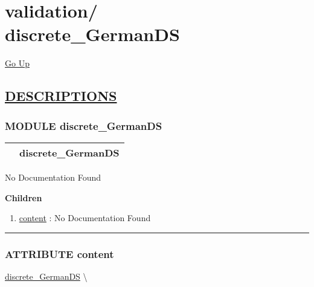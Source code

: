 \chapter*{\color{headfile}
{\large validation\slash\hspace{0pt}}
 \\
discrete_GermanDS
}
\hypertarget{ecldoc:toc:validation.discrete_GermanDS}{}
\hyperlink{ecldoc:toc:root/validation}{Go Up}


\section*{\underline{\textsf{DESCRIPTIONS}}}
\subsection*{\textsf{\colorbox{headtoc}{\color{white} MODULE}
discrete\_GermanDS}}

\hypertarget{ecldoc:validation.discrete_GermanDS}{}

{\renewcommand{\arraystretch}{1.5}
\begin{tabularx}{\textwidth}{|>{\raggedright\arraybackslash}l|X|}
\hline
\hspace{0pt}\mytexttt{\color{red} } & \textbf{discrete\_GermanDS} \\
\hline
\end{tabularx}
}

\par





No Documentation Found







\textbf{Children}
\begin{enumerate}
\item \hyperlink{ecldoc:validation.discrete_germands.content}{content}
: No Documentation Found
\end{enumerate}

\rule{\linewidth}{0.5pt}

\subsection*{\textsf{\colorbox{headtoc}{\color{white} ATTRIBUTE}
content}}

\hypertarget{ecldoc:validation.discrete_germands.content}{}
\hspace{0pt} \hyperlink{ecldoc:validation.discrete_GermanDS}{discrete_GermanDS} \textbackslash 

